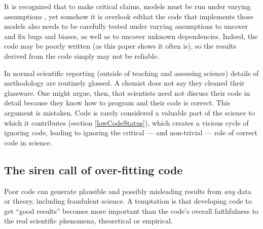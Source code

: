 \documentclass{comjnl}
\begin{document}
It is recognized that to make critical claims, models must be run under varying assumptions \cite{whitty}, yet somehow it is overlook edthat the code that implements those models also needs to be carefully tested under varying assumptions to uncover and fix bugs and biases, as well as to uncover unknown dependencies. Indeed, the code may be poorly written (as this paper shows it often is), so the results derived from the code simply may not be reliable. 

\label{section-vicious-cycles}
In normal scientific reporting (outside of teaching and assessing science) details of methodology are routinely glossed. A chemist does not say they cleaned their glassware. One might argue, then, that scientists need not discuss their code in detail because they know how to program and their code is correct. This argument is mistaken. Code is rarely considered a valuable part of the science to which it contributes (section \ref{lowCodeStatus}), which creates a vicious cycle of ignoring code, leading to ignoring the critical --- and non-trivial --- role of correct code in science. 

\subsection{The siren call of over-fitting code}\label{over-fit}
Poor code can generate plausible and possibly misleading results from \emph{any\/} data or theory, including fraudulent science. A temptation is that developing code to get ``good results'' becomes more important than the code's overall faithfulness to the real scientific phenomena, theoretical or empirical. 
\def\imageWidthCalculation{\multiply \imageWidth by 21 \divide \imageWidth by 28}
\def\figureStarDetails{*}

\def\imageWidthCalculation{\multiply \imageWidth by 21 \divide \imageWidth by 28}
\def\figureStarDetails{*}
\end{document}
